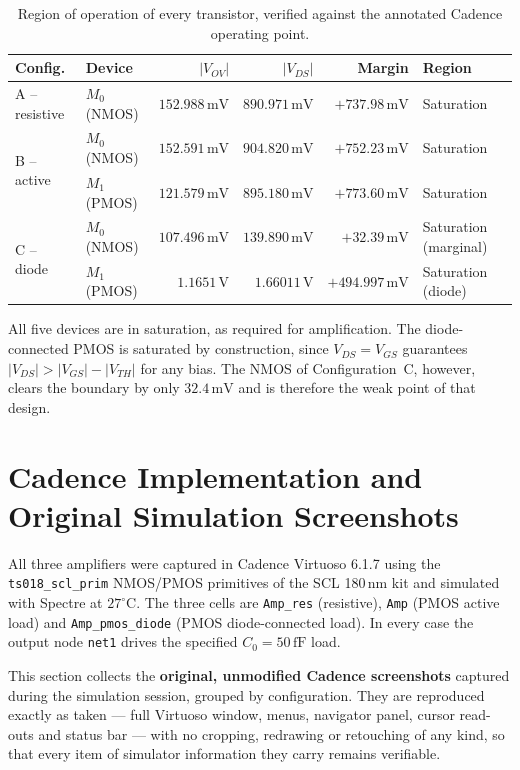 \documentclass[12pt,a4paper]{article}
\newcommand{\U}[1]{\,\mathrm{#1}}
\newcommand{\dg}{^{\circ}}
\begin{document}
\begin{table}[H]
\centering
\caption{Region of operation of every transistor, verified against the
annotated Cadence operating point.}
\label{tab:region}
\footnotesize
\begin{tabular}{llrrrl}
\toprule
\textbf{Config.} & \textbf{Device} & $|V_{OV}|$ & $|V_{DS}|$ &
\textbf{Margin} & \textbf{Region} \\
\midrule
A -- resistive & $M_0$ (NMOS) & $152.988\U{mV}$ & $890.971\U{mV}$ & $+737.98\U{mV}$ & Saturation \\
\midrule
\multirow{2}{*}{B -- active}
 & $M_0$ (NMOS) & $152.591\U{mV}$ & $904.820\U{mV}$ & $+752.23\U{mV}$ & Saturation \\
 & $M_1$ (PMOS) & $121.579\U{mV}$ & $895.180\U{mV}$ & $+773.60\U{mV}$ & Saturation \\
\midrule
\multirow{2}{*}{C -- diode}
 & $M_0$ (NMOS) & $107.496\U{mV}$ & $139.890\U{mV}$ & $+32.39\U{mV}$ & Saturation (marginal) \\
 & $M_1$ (PMOS) & $1.1651\U{V}$ & $1.66011\U{V}$ & $+494.997\U{mV}$ & Saturation (diode) \\
\bottomrule
\end{tabular}
\end{table}

All five devices are in saturation, as required for amplification. The
diode-connected PMOS is saturated by construction, since $V_{DS}=V_{GS}$
guarantees $|V_{DS}|>|V_{GS}|-|V_{TH}|$ for any bias. The NMOS of
Configuration~C, however, clears the boundary by only $32.4\U{mV}$ and is
therefore the weak point of that design.

\section{Cadence Implementation and Original Simulation Screenshots}
\label{sec:cadence}
All three amplifiers were captured in Cadence Virtuoso 6.1.7 using the
\texttt{ts018\_scl\_prim} NMOS/PMOS primitives of the SCL 180\,nm kit and
simulated with Spectre at $27\dg$C. The three cells are
\texttt{Amp\_res} (resistive), \texttt{Amp} (PMOS active load) and
\texttt{Amp\_pmos\_diode} (PMOS diode-connected load). In every case the
output node \texttt{net1} drives the specified $C_0 = 50\U{fF}$ load.

This section collects the \textbf{original, unmodified Cadence screenshots}
captured during the simulation session, grouped by configuration. They are
reproduced exactly as taken --- full Virtuoso window, menus, navigator panel,
cursor read-outs and status bar --- with no cropping, redrawing or
retouching of any kind, so that every item of simulator information they carry
remains verifiable.
\end{document}
